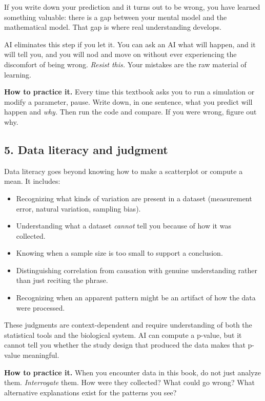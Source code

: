 \documentclass[
  letterpaper,
  DIV=11,
  numbers=noendperiod]{scrreprt}
\providecommand{\tightlist}{%
  \setlength{\itemsep}{0pt}\setlength{\parskip}{0pt}}
\begin{document}
If you write down your prediction and it turns out to be wrong, you have
learned something valuable: there is a gap between your mental model and
the mathematical model. That gap is where real understanding develops.

AI eliminates this step if you let it. You can ask an AI what will
happen, and it will tell you, and you will nod and move on without ever
experiencing the discomfort of being wrong. \emph{Resist this.} Your
mistakes are the raw material of learning.

\textbf{How to practice it.} Every time this textbook asks you to run a
simulation or modify a parameter, pause. Write down, in one sentence,
what you predict will happen and \emph{why.} Then run the code and
compare. If you were wrong, figure out why.

\subsection{5. Data literacy and
judgment}\label{data-literacy-and-judgment}

Data literacy goes beyond knowing how to make a scatterplot or compute a
mean. It includes:

\begin{itemize}
\tightlist
\item
  Recognizing what kinds of variation are present in a dataset
  (measurement error, natural variation, sampling bias).
\item
  Understanding what a dataset \emph{cannot} tell you because of how it
  was collected.
\item
  Knowing when a sample size is too small to support a conclusion.
\item
  Distinguishing correlation from causation with genuine understanding
  rather than just reciting the phrase.
\item
  Recognizing when an apparent pattern might be an artifact of how the
  data were processed.
\end{itemize}

These judgments are context-dependent and require understanding of both
the statistical tools and the biological system. AI can compute a
p-value, but it cannot tell you whether the study design that produced
the data makes that p-value meaningful.

\textbf{How to practice it.} When you encounter data in this book, do
not just analyze them. \emph{Interrogate} them. How were they collected?
What could go wrong? What alternative explanations exist for the
patterns you see?
\end{document}
